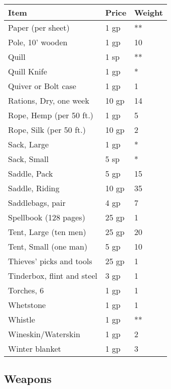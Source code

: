 \documentclass[a4paper,twoside,openany,10pt]{book}
\begin{document}
\begin{multicols}{2}
\begin{tabular*}{0.93\linewidth}{@{\extracolsep{\fill}}lll}
\textbf{Item} & \textbf{Price} & \textbf{Weight} \\\toprule
Paper (per sheet) & 1 gp & ** \\\hline
Pole, 10'{} wooden & 1 gp & 10 \\\hline
Quill & 1 sp & ** \\\hline
Quill Knife & 1 gp & * \\\hline
Quiver or Bolt case & 1 gp & 1 \\\hline
Rations, Dry, one week & 10 gp & 14 \\\hline
Rope, Hemp (per 50 ft.) & 1 gp & 5 \\\hline
Rope, Silk (per 50 ft.) & 10 gp & 2 \\\hline
Sack, Large & 1 gp & * \\\hline
Sack, Small & 5 sp & * \\\hline
Saddle, Pack & 5 gp & 15 \\\hline
Saddle, Riding & 10 gp & 35 \\\hline
Saddlebags, pair & 4 gp & 7 \\\hline
Spellbook (128 pages) & 25 gp & 1 \\\hline
Tent, Large (ten men) & 25 gp & 20 \\\hline
Tent, Small (one man) & 5 gp & 10 \\\hline
Thieves'{} picks and tools & 25 gp & 1 \\\hline
Tinderbox, flint and steel & 3 gp & 1 \\\hline
Torches, 6 & 1 gp & 1 \\\hline
Whetstone & 1 gp & 1 \\\hline
Whistle & 1 gp & ** \\\hline
Wineskin/Waterskin & 1 gp & 2 \\\hline
Winter blanket & 1 gp & 3 \\\bottomrule
\end{tabular*}

\subsection{Weapons}\label{weapons}

\begin{tabular*}{0.93\linewidth}{@{\extracolsep{\fill}}lllll}


\end{tabular*}
\end{multicols}
\end{document}
